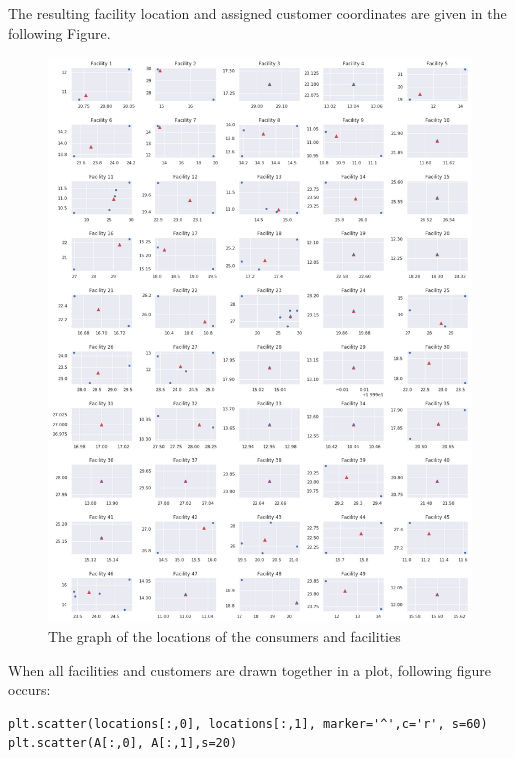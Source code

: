 \documentclass[12pt]{article}
\begin{document}
The resulting facility location and assigned customer coordinates are given in the following Figure.
\begin{figure}[ht] 
    \centering
    \includegraphics[width=\textwidth]{ala_squared_1.png}
    \caption{The graph of the locations of the consumers and facilities}
\end{figure}
\FloatBarrier
When all facilities and customers are drawn together in a plot, following figure occurs:
\begin{lstlisting}[style=pythonstyle]
plt.scatter(locations[:,0], locations[:,1], marker='^',c='r', s=60)
plt.scatter(A[:,0], A[:,1],s=20)
\end{lstlisting}
\end{document}
